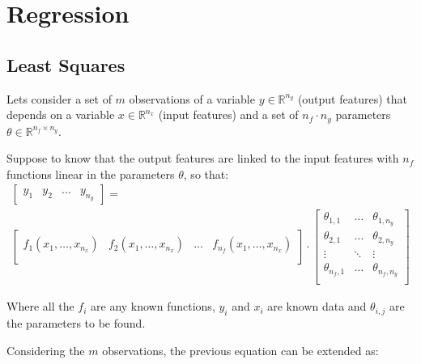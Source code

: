 \section{Regression}
\label{sec:Regression}


\subsection{Least Squares}
\label{subsec:LS}

Lets consider a set of $m$ observations of a variable $y \in \mathbb{R}^{n_y}$ (output features) that depends on a variable $x \in \mathbb{R}^{n_x}$ (input features) and a set of $n_f \cdot n_y$ parameters $\theta \in \mathbb{R}^{n_f \times n_y}$.

Suppose to know that the output features are linked to the input features with $n_f$ functions linear in the parameters $\theta$, so that:
\begin{multline*}
    \begin{bmatrix}
        y_1 & y_2 & \dots & y_{n_y} 
    \end{bmatrix}
    =\\
        \begin{bmatrix}
            f_1(x_1, \dots, x_{n_x}) & f_2(x_1, \dots, x_{n_x}) & \dots & f_{n_f}(x_1, \dots, x_{n_x}) \\
        \end{bmatrix}
        \cdot
        \begin{bmatrix}
            \theta_{1,1}  & \dots & \theta_{1,n_y} \\
            \theta_{2,1}  & \dots & \theta_{2,n_y} \\
            \vdots & \ddots & \vdots \\
            \theta_{n_f,1}  & \dots & \theta_{n_f,n_y} \\
        \end{bmatrix}
\end{multline*}

Where all the $f_i$ are any known functions, $y_i$ and $x_i$ are known data and $\theta_{i,j}$ are the parameters to be found.

Considering the $m$ observations, the previous equation can be extended as:

